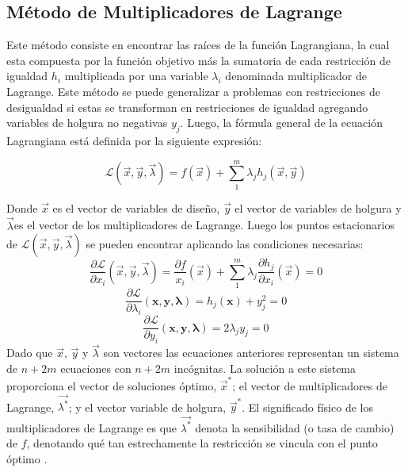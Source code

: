 \subsection{Método de Multiplicadores de Lagrange}
Este método consiste en encontrar las raíces de la función Lagrangiana, la cual esta compuesta por la función objetivo más la sumatoria de cada restricción de igualdad $h_i$ multiplicada por una variable $\lambda_i$ denominada multiplicador de Lagrange. Este método se puede generalizar a problemas con restricciones de desigualdad si estas se transforman en restricciones de igualdad agregando variables de holgura no negativas $y_j$. Luego, la fórmula general de la ecuación Lagrangiana está definida por la siguiente expresión:

\begin{equation}
\mathcal{L} (\vec{x},\vec{y},\vec{\lambda})=f(\vec{x})+ \sum_{1}^m \lambda_j h_j(\vec{x},\vec{y})
\end{equation}

Donde $\vec{x}$ es el vector de variables de diseño, $\vec{y}$ el vector de variables de holgura y $\vec{\lambda}$es el vector de los multiplicadores de Lagrange. Luego los puntos estacionarios de $\mathcal{L} (\vec{x},\vec{y},\vec{\lambda})$ se pueden encontrar aplicando las condiciones necesarias:
\begin{equation}
\frac{\partial \mathcal{L}}{\partial x_i} (\vec{x},\vec{y},\vec{\lambda})=\frac{\partial f}{x_i}(\vec{x})+ \sum_{1}^m \lambda_j \frac{\partial h_j}{\partial x_i} (\vec{x})=0
\end{equation}
\begin{equation}
\frac{\partial \mathcal{L}}{\partial \lambda_i} (\textbf{x},\textbf{y},\boldsymbol{\lambda})= h_j(\textbf{x})+y^2_j=0 
\end{equation}
\begin{equation}
\frac{\partial \mathcal{L}}{\partial y_i} (\textbf{x},\textbf{y},\boldsymbol{\lambda})=2 \lambda_j y_j=0
\end{equation}
Dado que $\vec{x}$, $\vec{y}$ y $\vec{\lambda}$ son vectores las ecuaciones anteriores representan un sistema de $n+2m$ ecuaciones con $n+2m$ incógnitas. La solución a este sistema proporciona  el vector de soluciones óptimo, $\vec{x}^*$; el vector de multiplicadores de Lagrange, $\vec{\lambda^*}$; y el vector variable de holgura, $\vec{y}^*$. El significado físico de los multiplicadores de Lagrange es que $\vec{\lambda^*}$ denota la sensibilidad (o tasa de cambio) de $f$, denotando qué tan estrechamente la restricción se vincula con el punto óptimo \cite{rao_engineering_2009}.

